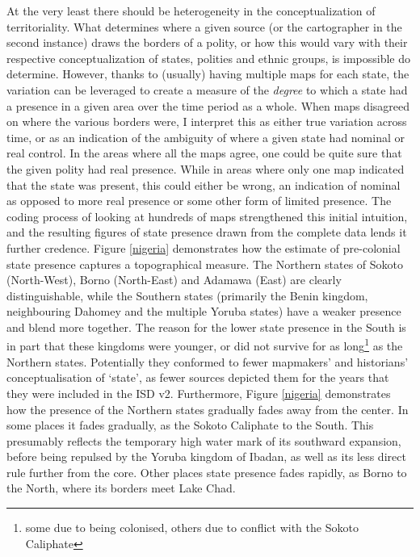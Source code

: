 At the very least there should be heterogeneity in the conceptualization of
territoriality. What determines where a given source (or the cartographer in the
second instance) draws the borders of a polity, or how this would vary with
their respective conceptualization of states, polities and ethnic groups, is
impossible do determine. However, thanks to (usually) having multiple maps for
each state, the variation can be leveraged to create a measure of the
\textit{degree} to which a state had a presence in a given area over the time
period as a whole. When maps disagreed on where the various borders were, I
interpret this as either true variation across time, or as an indication of the
ambiguity of where a given state had nominal or real control. In the areas where
all the maps agree, one could be quite sure that the given polity had real
presence.  While in areas where only one map indicated that the state was
present, this could either be wrong, an indication of nominal as opposed to more
real presence or some other form of limited presence. The coding process of
looking at hundreds of maps strengthened this initial intuition, and the
resulting figures of state presence drawn from the complete data lends it
further credence. Figure \ref{nigeria} demonstrates how the estimate of
pre-colonial state presence captures a topographical measure. The Northern
states of Sokoto (North-West), Borno (North-East) and Adamawa (East) are clearly
distinguishable, while the Southern states (primarily the Benin kingdom,
neighbouring Dahomey and the multiple Yoruba states) have a weaker presence and
blend more together. The reason for the lower state presence in the South is in
part that these kingdoms were younger, or did not survive for as
long\footnote{some due to being colonised, others due to conflict with the
Sokoto Caliphate} as the Northern states. Potentially they conformed to fewer
mapmakers' and historians' conceptualisation of `state', as fewer sources
depicted them for the years that they were included in the ISD v2. Furthermore,
Figure \ref{nigeria} demonstrates how the presence of the Northern states
gradually fades away from the center. In some places it fades gradually, as the
Sokoto Caliphate to the South. This presumably reflects the temporary high water
mark of its southward expansion, before being repulsed by the Yoruba kingdom of
Ibadan, as well as its less direct rule further from the core. Other places
state presence fades rapidly, as Borno to the North, where its borders meet Lake
Chad.


